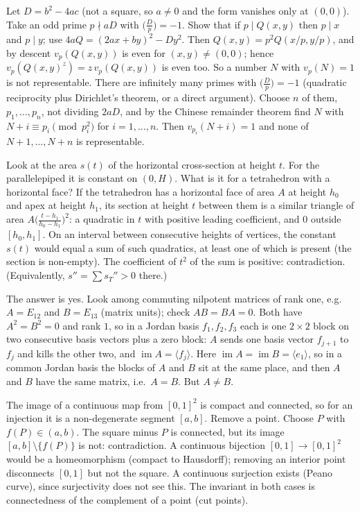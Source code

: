 \documentclass[11pt,a4paper]{article}
\begin{document}
 Let $D=b^2-4ac$ (not a square, so $a\ne0$ and the form vanishes only at $(0,0)$). Take an odd prime $p\nmid aD$ with $\bigl(\frac Dp\bigr)=-1$. Show that if $p\mid Q(x,y)$ then $p\mid x$ and $p\mid y$; use $4aQ=(2ax+by)^2-Dy^2$.
 Then $Q(x,y)=p^2Q(x/p,y/p)$, and by descent $v_p(Q(x,y))$ is even for $(x,y)\ne(0,0)$; hence $v_p(Q(x,y)^z)=z\,v_p(Q(x,y))$ is even too. So a number $N$ with $v_p(N)=1$ is not representable.
 There are infinitely many primes with $\bigl(\frac Dp\bigr)=-1$ (quadratic reciprocity plus Dirichlet's theorem, or a direct argument). Choose $n$ of them, $p_1,\dots,p_n$, not dividing $2aD$, and by the Chinese remainder theorem find $N$ with $N+i\equiv p_i\pmod{p_i^2}$ for $i=1,\dots,n$. Then $v_{p_i}(N+i)=1$ and none of $N+1,\dots,N+n$ is representable.

 Look at the area $s(t)$ of the horizontal cross-section at height $t$. For the parallelepiped it is constant on $(0,H)$. What is it for a tetrahedron with a horizontal face?
 If the tetrahedron has a horizontal face of area $A$ at height $h_0$ and apex at height $h_1$, its section at height $t$ between them is a similar triangle of area $A\bigl(\frac{t-h_1}{h_0-h_1}\bigr)^2$: a quadratic in $t$ with positive leading coefficient, and $0$ outside $[h_0,h_1]$.
 On an interval between consecutive heights of vertices, the constant $s(t)$ would equal a sum of such quadratics, at least one of which is present (the section is non-empty). The coefficient of $t^2$ of the sum is positive: contradiction. (Equivalently, $s''=\sum s_T''>0$ there.)

 The answer is yes. Look among commuting nilpotent matrices of rank one, e.g.\ $A=E_{12}$ and $B=E_{13}$ (matrix units); check $AB=BA=0$.
 Both have $A^2=B^2=0$ and rank $1$, so in a Jordan basis $f_1,f_2,f_3$ each is one $2\times2$ block on two consecutive basis vectors plus a zero block: $A$ sends one basis vector $f_{j+1}$ to $f_j$ and kills the other two, and $\operatorname{im}A=\langle f_j\rangle$.
 Here $\operatorname{im}A=\operatorname{im}B=\langle e_1\rangle$, so in a common Jordan basis the blocks of $A$ and $B$ sit at the same place, and then $A$ and $B$ have the same matrix, i.e.\ $A=B$. But $A\ne B$.

 The image of a continuous map from $[0,1]^2$ is compact and connected, so for an injection it is a non-degenerate segment $[a,b]$. Remove a point.
 Choose $P$ with $f(P)\in(a,b)$. The square minus $P$ is connected, but its image $[a,b]\setminus\{f(P)\}$ is not: contradiction.
 A continuous bijection $[0,1]\to[0,1]^2$ would be a homeomorphism (compact to Hausdorff); removing an interior point disconnects $[0,1]$ but not the square. A continuous surjection exists (Peano curve), since surjectivity does not see this. The invariant in both cases is connectedness of the complement of a point (cut points).
\end{document}
